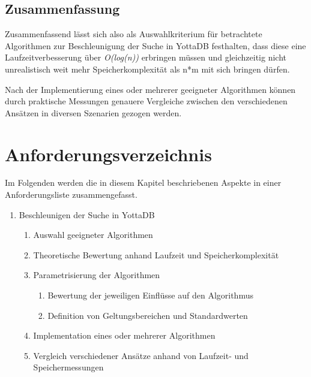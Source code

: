 \documentclass[oneside]{ausarbeitung}
\begin{document}
	
	
	\subsection{Zusammenfassung}
	
	Zusammenfassend lässt sich also als Auswahlkriterium für betrachtete Algorithmen zur Beschleunigung der Suche in YottaDB festhalten, dass diese eine Laufzeitverbesserung über \textit{O(log(n))} erbringen müssen und gleichzeitig nicht unrealistisch weit mehr Speicherkomplexität als n*m mit sich bringen dürfen.
	
	Nach der Implementierung eines oder mehrerer geeigneter Algorithmen können durch praktische Messungen genauere Vergleiche zwischen den verschiedenen Ansätzen in diversen Szenarien gezogen werden. 
	
	
	
	
	
	
	\section{Anforderungsverzeichnis}

	Im Folgenden werden die in diesem Kapitel beschriebenen Aspekte in einer Anforderungsliste zusammengefasst. 
	
	\begin{enumerate}
		\item Beschleunigen der Suche in YottaDB
		\begin{enumerate}
			\item Auswahl geeigneter Algorithmen 
			\item Theoretische Bewertung anhand Laufzeit und Speicherkomplexität
			\item Parametrisierung der Algorithmen 
			\begin{enumerate}
				\item Bewertung der jeweiligen Einflüsse auf den Algorithmus
				\item Definition von Geltungsbereichen und Standardwerten
			\end{enumerate}
			\item Implementation eines oder mehrerer Algorithmen
			\item Vergleich verschiedener Ansätze anhand von Laufzeit- und Speichermessungen
		\end{enumerate}

	\end{enumerate}

	
	
\end{document}
